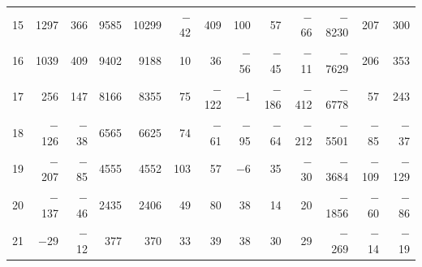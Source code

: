 \begin{table}[H]
\begin{tabular}{crrrrrrrrrrrr}
        15 & 1297 & 366 & 9585 & 10299 & $-$42 & 409 & 100 & 57 & $-$66 & $-$8230 & 207 & 300 \\
        16 & 1039 & 409 & 9402 & 9188 & 10 & 36 & $-$56 & $-$45 & $-$11 & $-$7629 & 206 & 353 \\
        17 & 256 & 147 & 8166 & 8355 & 75 & $-$122 & $-$1 & $-$186 & $-$412 & $-$6778 & 57 & 243 \\
        18 & $-$126 & $-$38 & 6565 & 6625 & 74 & $-$61 & $-$95 & $-$64 & $-$212 & $-$5501 & $-$85 & $-$37 \\
        19 & $-$207 & $-$85 & 4555 & 4552 & 103 & 57 & $-$6 & 35 & $-$30 & $-$3684 & $-$109 & $-$129 \\
        20 & $-$137 & $-$46 & 2435 & 2406 & 49 & 80 & 38 & 14 & 20 & $-$1856 & $-$60 & $-$86 \\
        21 & $-$29 & $-$12 & 377 & 370 & 33 & 39 & 38 & 30 & 29 & $-$269 & $-$14 & $-$19 \\
        \hline
    \end{tabular}
\end{table}

